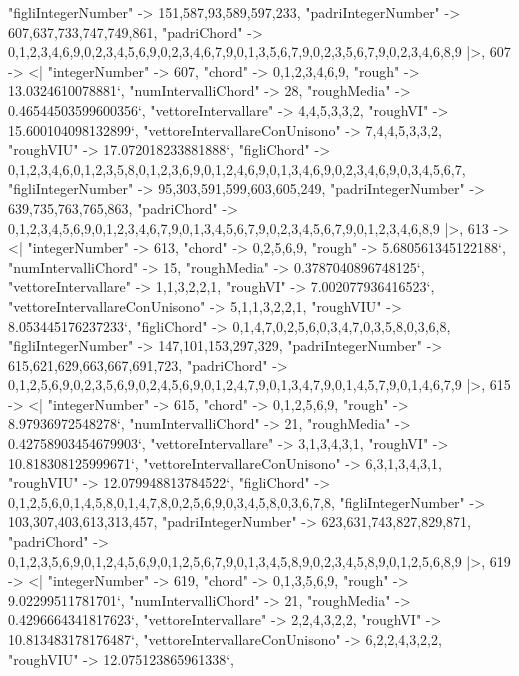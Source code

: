 \documentclass[
]{article}
\begin{document}
\begin{DatasetVerbatim}
    "figliIntegerNumber" -> {151,587,93,589,597,233},
    "padriIntegerNumber" -> {607,637,733,747,749,861},
    "padriChord" -> {{0,1,2,3,4,6,9},{0,2,3,4,5,6,9},{0,2,3,4,6,7,9},{0,1,3,5,6,7,9},{0,2,3,5,6,7,9},{0,2,3,4,6,8,9}}
  |>,
  607 -> <|
    "integerNumber" -> 607,
    "chord" -> {0,1,2,3,4,6,9},
    "rough" -> 13.0324610078881`,
    "numIntervalliChord" -> 28,
    "roughMedia" -> 0.46544503599600356`,
    "vettoreIntervallare" -> {4,4,5,3,3,2},
    "roughVI" -> 15.600104098132899`,
    "vettoreIntervallareConUnisono" -> {7,4,4,5,3,3,2},
    "roughVIU" -> 17.072018233881888`,
    "figliChord" -> {{0,1,2,3,4,6},{0,1,2,3,5,8},{0,1,2,3,6,9},{0,1,2,4,6,9},{0,1,3,4,6,9},{0,2,3,4,6,9},{0,3,4,5,6,7}},
    "figliIntegerNumber" -> {95,303,591,599,603,605,249},
    "padriIntegerNumber" -> {639,735,763,765,863},
    "padriChord" -> {{0,1,2,3,4,5,6,9},{0,1,2,3,4,6,7,9},{0,1,3,4,5,6,7,9},{0,2,3,4,5,6,7,9},{0,1,2,3,4,6,8,9}}
  |>,
  613 -> <|
    "integerNumber" -> 613,
    "chord" -> {0,2,5,6,9},
    "rough" -> 5.680561345122188`,
    "numIntervalliChord" -> 15,
    "roughMedia" -> 0.3787040896748125`,
    "vettoreIntervallare" -> {1,1,3,2,2,1},
    "roughVI" -> 7.002077936416523`,
    "vettoreIntervallareConUnisono" -> {5,1,1,3,2,2,1},
    "roughVIU" -> 8.053445176237233`,
    "figliChord" -> {{0,1,4,7},{0,2,5,6},{0,3,4,7},{0,3,5,8},{0,3,6,8}},
    "figliIntegerNumber" -> {147,101,153,297,329},
    "padriIntegerNumber" -> {615,621,629,663,667,691,723},
    "padriChord" -> {{0,1,2,5,6,9},{0,2,3,5,6,9},{0,2,4,5,6,9},{0,1,2,4,7,9},{0,1,3,4,7,9},{0,1,4,5,7,9},{0,1,4,6,7,9}}
  |>,
  615 -> <|
    "integerNumber" -> 615,
    "chord" -> {0,1,2,5,6,9},
    "rough" -> 8.97936972548278`,
    "numIntervalliChord" -> 21,
    "roughMedia" -> 0.42758903454679903`,
    "vettoreIntervallare" -> {3,1,3,4,3,1},
    "roughVI" -> 10.818308125999671`,
    "vettoreIntervallareConUnisono" -> {6,3,1,3,4,3,1},
    "roughVIU" -> 12.079948813784522`,
    "figliChord" -> {{0,1,2,5,6},{0,1,4,5,8},{0,1,4,7,8},{0,2,5,6,9},{0,3,4,5,8},{0,3,6,7,8}},
    "figliIntegerNumber" -> {103,307,403,613,313,457},
    "padriIntegerNumber" -> {623,631,743,827,829,871},
    "padriChord" -> {{0,1,2,3,5,6,9},{0,1,2,4,5,6,9},{0,1,2,5,6,7,9},{0,1,3,4,5,8,9},{0,2,3,4,5,8,9},{0,1,2,5,6,8,9}}
  |>,
  619 -> <|
    "integerNumber" -> 619,
    "chord" -> {0,1,3,5,6,9},
    "rough" -> 9.02299511781701`,
    "numIntervalliChord" -> 21,
    "roughMedia" -> 0.4296664341817623`,
    "vettoreIntervallare" -> {2,2,4,3,2,2},
    "roughVI" -> 10.813483178176487`,
    "vettoreIntervallareConUnisono" -> {6,2,2,4,3,2,2},
    "roughVIU" -> 12.075123865961338`,

\end{DatasetVerbatim}
\end{document}
